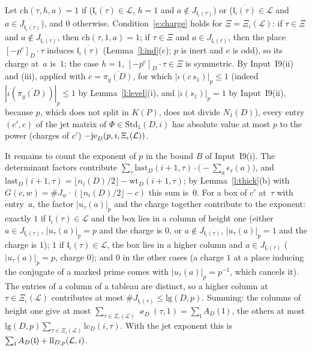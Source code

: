 \documentclass[11pt,a4paper]{article}
\makeatletter
\newcommand{\lean}[1]{\csname LN@#1\endcsname}
\newcommand{\leantag}{{\sffamily\bfseries\fontsize{6.3}{8}\selectfont\color{leancol}\addfontfeatures{LetterSpace=7}LEAN}}
\newcommand{\leanline}[1]{\par\nopagebreak\vspace{-2.5pt}{\fontsize{8.9}{12.4}\selectfont\color{inksoft}\raggedright
  \noindent\llap{\leantag\hspace{9pt}}#1\par}\vspace{1pt}}
\theoremstyle{plainx}
\theoremstyle{uprightx}
\renewenvironment{proof}[1][Proof]{\par\pushQED{\qed}\normalfont\topsep0pt\partopsep0pt
  \trivlist\item[\hskip\labelsep\itshape #1.]\ignorespaces}{\popQED\endtrivlist\@endpefalse}
\newcommand{\cj}[1]{\overline{#1}}
\newcommand{\KP}[1]{K(#1)}
\newcommand{\NnD}[1]{N_1(#1)}
\newcommand{\pin}[2]{[#2]_{#1}}
\newcommand{\nD}[2]{n_{#2}(#1)}
\newcommand{\wtD}[3]{\mathrm{wt}_{#1}(#2,#3)}
\newcommand{\pig}[1]{\pi_g(#1)}
\newcommand{\rr}[2]{\mathrm{lg}(#1,#2)}
\newcommand{\kap}[3]{\varkappa_{#1}(#2,#3)}
\newcommand{\last}[3]{\mathrm{last}_{#1}(#2,#3)}
\newcommand{\Std}[2]{\mathrm{Std}_{#1}(#2)}
\newcommand{\ind}[1]{\mathfrak{l}_{\iota}(#1)}
\newcommand{\mexp}[2]{A_{#1}(#2)}
\newcommand{\lc}[3]{\mathrm{lc}_{#1}(#2,#3)}
\newcommand{\even}[1]{\Xi_{\iota}(#1)}
\makeatother
\begin{document}
\begin{proof}
Let $\mathrm{ch}(\tau,h,a)=1$ if ($\ind{\tau}\in\mathcal{L}$, $h=1$ and $a\notin J_{\ind{\tau}}$) or
($\cj{\ind{\tau}}\in\mathcal{L}$ and $a\in J_{\cj{\ind{\tau}}}$), and $0$ otherwise. Condition~\eqref{e:charge}
holds for $\Xi=\even{\mathcal{L}}$: if $\tau\in\Xi$ and $a\notin J_{\ind{\tau}}$, then $\mathrm{ch}(\tau,1,a)=1$;
if $\tau\in\Xi$ and $a\in J_{\ind{\tau}}$, then the place $\pin{D}{-p^{e}}\cdot\tau$ induces
$\cj{\ind{\tau}}$ (Lemma~\ref{l:ind}(c); $p$ is inert and $e$ is odd), so its charge at~$a$ is~$1$; the case
$h=1$, $\pin{D}{-p^{e}}\cdot\tau\in\Xi$ is symmetric. By Input~I9(ii) and (iii), applied with $c=\cj{\pig{D}}$,
for which $|\iota(c\,s_1)|_p\le1$ (indeed $|\iota(\cj{\pig{D}})|_p\le1$ by Lemma~\ref{l:level}(i), and $|\iota(s_1)|_p=1$ by
Input~I9(ii), because $p$, which does not split in $\KP{P}$, does not divide $\NnD{D}$), every entry $(c',c)$ of the jet matrix of
$\Phi\in\Std{1}{D,i}$ has absolute value at most $p$ to the power (charges of $c'$)
$-\jetexp{p}{i}{\even{\mathcal{L}}}$.

It remains to count the exponent of $p$ in the bound $B$ of Input~I9(i). The determinant factors contribute
$\sum_\tau\last{D}{i+1}{\tau}\cdot\bigl(-\sum_a\epsilon_\tau(a)\bigr)$, and
$\last{D}{i+1}{\tau}=\lfloor\nD{D}{i}/2\rfloor-\wtD{D}{i+1}{\tau}$; by Lemma~\ref{l:thick}(b) with
$G(c,w)=\#J_w\cdot(\lfloor\nD{D}{i}/2\rfloor-c)$ this sum is~$0$. For a box of $c'$ at~$\tau$ with entry~$a$,
the factor $|u_\tau(a)|_p$ and the charge together contribute to the exponent: exactly $1$ if
$\ind{\tau}\in\mathcal{L}$ and the box lies in a column of height one (either $a\in J_{\ind{\tau}}$,
$|u_\tau(a)|_p=p$ and the charge is $0$, or $a\notin J_{\ind{\tau}}$, $|u_\tau(a)|_p=1$ and the charge is $1$);
$1$ if $\ind{\tau}\in\mathcal{L}$, the box lies in a higher column and $a\in J_{\ind{\tau}}$ ($|u_\tau(a)|_p=p$,
charge $0$); and $0$ in the other cases (a charge $1$ at a place inducing the conjugate of a marked prime
comes with $|u_\tau(a)|_p=p^{-1}$, which cancels it). The entries of a column of a tableau are distinct, so a
higher column at $\tau\in\even{\mathcal{L}}$ contributes at most $\#J_{\ind{\tau}}\le\rr{D}{p}$. Summing: the
columns of height one give at most $\sum_{\tau\in\even{\mathcal{L}}}\kap{D}{\tau}{1}=\sum_{\mathfrak{l}}\mexp{D}{\mathfrak{l}}$,
the others at most $\rr{D}{p}\sum_{\tau\in\even{\mathcal{L}}}\lc{D}{i}{\tau}$. With the jet exponent this is
$\sum_{\mathfrak{l}}\mexp{D}{\mathfrak{l}}+\liftloss{\mathcal{L}}{i}$.
\end{proof}
\leanline{\lean{memraises}}
\end{document}
